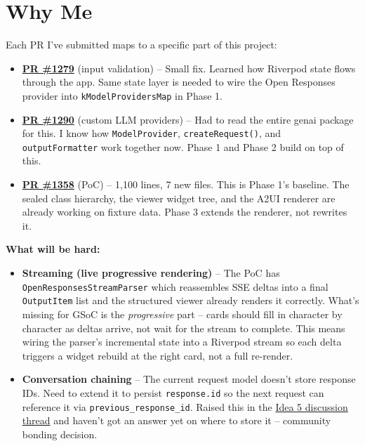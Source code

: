 \documentclass[11pt,a4paper]{article}
\begin{document}
\newpage

\section{Why Me}

Each PR I've submitted maps to a specific part of this project:

\begin{itemize}
  \item \textbf{\href{https://github.com/foss42/apidash/pull/1279}{PR \#1279}} (input validation) -- Small fix. Learned how Riverpod state flows through the app. Same state layer is needed to wire the Open Responses provider into \texttt{kModelProvidersMap} in Phase 1.

  \item \textbf{\href{https://github.com/foss42/apidash/pull/1290}{PR \#1290}} (custom LLM providers) -- Had to read the entire genai package for this. I know how \texttt{ModelProvider}, \texttt{createRequest()}, and \texttt{outputFormatter} work together now. Phase 1 and Phase 2 build on top of this.

  \item \textbf{\href{https://github.com/foss42/apidash/pull/1358}{PR \#1358}} (PoC) -- 1,100 lines, 7 new files. This is Phase 1's baseline. The sealed class hierarchy, the viewer widget tree, and the A2UI renderer are already working on fixture data. Phase 3 extends the renderer, not rewrites it.
\end{itemize}

\textbf{What will be hard:}

\begin{itemize}
  \item \textbf{Streaming (live progressive rendering)} -- The PoC has \texttt{OpenResponsesStreamParser} which reassembles SSE deltas into a final \texttt{OutputItem} list and the structured viewer already renders it correctly. What's missing for GSoC is the \textit{progressive} part -- cards should fill in character by character as deltas arrive, not wait for the stream to complete. This means wiring the parser's incremental state into a Riverpod stream so each delta triggers a widget rebuild at the right card, not a full re-render.

  \item \textbf{Conversation chaining} -- The current request model doesn't store response IDs. Need to extend it to persist \texttt{response.id} so the next request can reference it via \texttt{previous\_response\_id}. Raised this in the \href{https://github.com/foss42/apidash/discussions/1227}{Idea 5 discussion thread} and haven't got an answer yet on where to store it -- community bonding decision.
\end{itemize}
\end{document}
